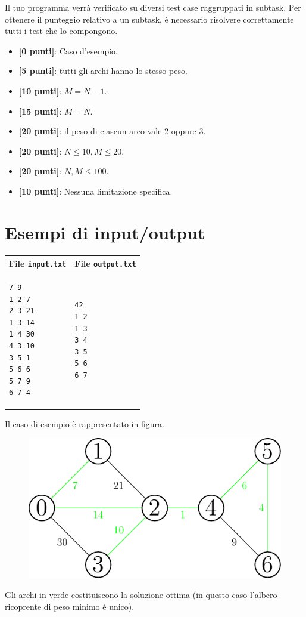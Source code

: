 \documentclass[a4paper,11pt]{article}
\begin{document}
Il tuo programma verrà verificato su diversi test case raggruppati in subtask.
Per ottenere il punteggio relativo a un subtask, è necessario risolvere correttamente tutti i test che lo compongono.

\begin{itemize}
  \item \textbf{ [0 punti]}: Caso d'esempio.
  \item \textbf{ [5 punti]}: tutti gli archi hanno lo stesso peso.
  \item \textbf{ [10 punti]}: $M=N-1$.
  \item \textbf{ [15 punti]}: $M=N$.
  \item \textbf{ [20 punti]}: il peso di ciascun arco vale $2$ oppure $3$.
  \item \textbf{ [20 punti]}: $N\leq 10, M\leq 20$.
  \item \textbf{ [20 punti]}: $N, M\leq 100$.
  \item \textbf{ [10 punti]}: Nessuna limitazione specifica.
\end{itemize}

  
\section*{Esempi di input/output}

  
    \noindent
    \begin{tabular}{p{11cm}|p{5cm}}
    \toprule
    \textbf{File \texttt{input.txt}}
    & \textbf{File \texttt{output.txt}}
    \\
    \midrule
    \scriptsize
    \begin{verbatim}
7 9
1 2 7
2 3 21
1 3 14
1 4 30
4 3 10
3 5 1
5 6 6
5 7 9
6 7 4
    \end{verbatim}
    &
    \scriptsize
    \begin{verbatim}
42
1 2
1 3
3 4
3 5
5 6
6 7
    \end{verbatim}
    \\
    \bottomrule
    \end{tabular}

\bigskip
    
Il caso di esempio è rappresentato in figura.
\begin{figure}[ht]
	\centering
	\includegraphics[scale = 0.8]{asy_mst/mst.pdf}
\end{figure}

Gli archi in verde costituiscono la soluzione ottima (in questo caso l'albero ricoprente di peso minimo è unico).
\end{document}
